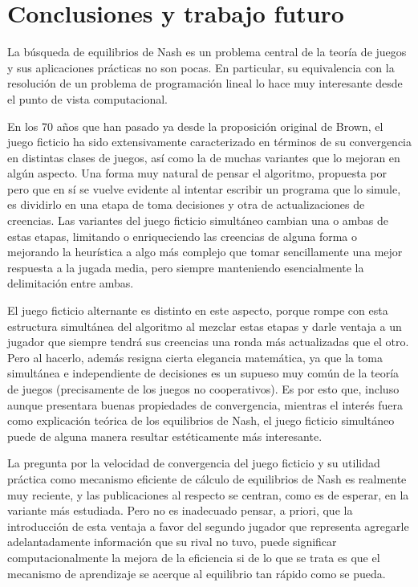\chapter{Conclusiones y trabajo futuro}

La búsqueda de equilibrios de Nash es un problema central de la teoría de juegos y sus aplicaciones prácticas no son pocas. En particular, su equivalencia con la resolución de un problema de programación lineal lo hace muy interesante desde el punto de vista computacional.

En los 70 años que han pasado ya desde la proposición original de Brown, el juego ficticio ha sido extensivamente caracterizado en términos de su convergencia en distintas clases de juegos, así como la de muchas variantes que lo mejoran en algún aspecto. Una forma muy natural de pensar el algoritmo, propuesta por \cite{extending:pattern} pero que en sí se vuelve evidente al intentar escribir un programa que lo simule, es dividirlo en una etapa de toma decisiones y otra de actualizaciones de creencias. Las variantes del juego ficticio simultáneo cambian una o ambas de estas etapas, limitando o enriqueciendo las creencias de alguna forma o mejorando la heurística a algo más complejo que tomar sencillamente una mejor respuesta a la jugada media, pero siempre manteniendo esencialmente la delimitación entre ambas.

El juego ficticio alternante es distinto en este aspecto, porque rompe con esta estructura simultánea del algoritmo al mezclar estas etapas y darle ventaja a un jugador que siempre tendrá sus creencias una ronda más actualizadas que el otro. Pero al hacerlo, además resigna cierta elegancia matemática, ya que la toma simultánea e independiente de decisiones es un supueso muy común de la teoría de juegos (precisamente de los juegos no cooperativos). Es por esto que, incluso aunque presentara buenas propiedades de convergencia, mientras el interés fuera como explicación teórica de los equilibrios de Nash, el juego ficticio simultáneo puede de alguna manera resultar estéticamente más interesante.

La pregunta por la velocidad de convergencia del juego ficticio y su utilidad práctica como mecanismo eficiente de cálculo de equilibrios de Nash es realmente muy reciente, y las publicaciones al respecto se centran, como es de esperar, en la variante más estudiada. Pero no es inadecuado pensar, a priori, que la introducción de esta ventaja a favor del segundo jugador que representa agregarle adelantadamente información que su rival no tuvo, puede significar computacionalmente la mejora de la eficiencia si de lo que se trata es que el mecanismo de aprendizaje se acerque al equilibrio tan rápido como se pueda.

